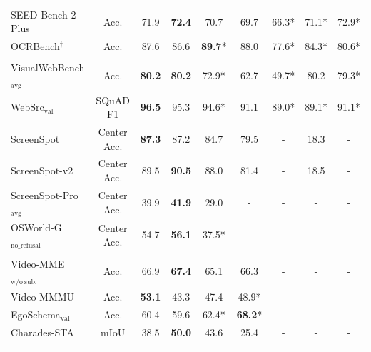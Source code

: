 \begin{table}[htbp]
{\begin{tabular}{l c | S[table-format=2.1] S[table-format=2.1] | S[table-format=2.1] S[table-format=2.1] S[table-format=2.1] | S[table-format=2.1] S[table-format=2.1]}
    SEED-Bench-2-Plus                     &  Acc.        & 71.9  & \textbf{72.4} & 70.7  & 69.7  &   66.3*    &   71.1*  & 72.9*                \\
    OCRBench$^{\dag}$                     &  Acc.        & 87.6  & 86.6  & \textbf{89.7}* & 88.0  &   77.6*    & 84.3*  &  80.6*               \\
    \midrule
     \\ %
    VisualWebBench$_{\mathrm{avg}}$       &  Acc.        &  \textbf{80.2} & \textbf{80.2}  & 72.9* & 62.7  &    49.7*   & 80.2  &  79.3*               \\
    WebSrc$_{\mathrm{val}}$               &  SQuAD F1    &  \textbf{96.5} & 95.3  & 94.6* & 91.1  &    89.0*   & 89.1*   & 91.1*                \\
    ScreenSpot                            & Center Acc.  &  \textbf{87.3} & 87.2  & 84.7  & 79.5  &   {-}    & 18.3   &  {-}               \\
    ScreenSpot-v2                         & Center Acc.  & 89.5  & \textbf{90.5} & 88.0  & 81.4  &   {-}    & 18.5   &  {-}               \\
    ScreenSpot-Pro$_{\mathrm{avg}}$                & Center Acc.  & 39.9  & \textbf{41.9} & 29.0  &  {-}  &   {-}    & {-}    &   {-}              \\
    OSWorld-G$_{\mathrm{no\_refusal}}$    & Center Acc.  &  54.7 & \textbf{56.1} & 37.5* &  {-}  &   {-}    & {-}    &   {-}              \\
    \midrule
     \\ %
    Video-MME$_{\mathrm{w/o~sub.}}$                             & Acc.         & 66.9  & \textbf{67.4} & 65.1 & 66.3  &    {-}   & {-}    &     {-}            \\
    Video-MMMU                            & Acc.         &  \textbf{53.1} &   43.3   & 47.4  &   48.9*    &   {-}    & {-}    &    {-}             \\
    EgoSchema$_{\mathrm{val}}$                             & Acc.         & 60.4  & 59.6  & 62.4* &   \textbf{68.2}*   &   {-}   & {-}    &    {-}             \\
    Charades-STA                          & mIoU         &   38.5    & \textbf{50.0} & 43.6  &   25.4    &    {-}   & {-}    &  {-}               \\
    \midrule
     \\ %

\end{tabular}}
\end{table}
